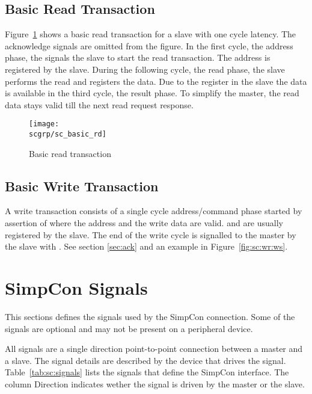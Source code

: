 \subsection{Basic Read Transaction}

Figure~\ref{fig:sc:basic:rd} shows a basic read transaction for a
slave with one cycle latency. The acknowledge signals are omitted
from the figure. In the first cycle, the address phase, the
 signals the slave to start the read transaction. The
address is registered by the slave. During the following cycle, the
read phase, the slave performs the read and registers the data. Due
to the register in the slave the data is available in the third
cycle, the result phase. To simplify the master, the read data stays
valid till the next read request response.

\begin{figure}
    \centering
    \texttt{[image: \\scgrp/sc\_basic\_rd]}
    \caption{Basic read transaction}
    \label{fig:sc:basic:rd}
\end{figure}

\subsection{Basic Write Transaction}

A write transaction consists of a single cycle address/command phase
started by assertion of  where the address and the write
data are valid.  and  are usually
registered by the slave. The end of the write cycle is signalled to
the master by the slave with . See section
\ref{sec:ack} and an example in Figure~\ref{fig:sc:wr:ws}.

\section{SimpCon Signals}

This sections defines the signals used by the SimpCon connection.
Some of the signals are optional and may not be present on a
peripheral device.

All signals are a single direction point-to-point connection between
a master and a slave. The signal details are described by the device
that drives the signal. Table~\ref{tab:sc:signals} lists the signals
that define the SimpCon interface. The column Direction indicates
wether the signal is driven by the master or the slave.

